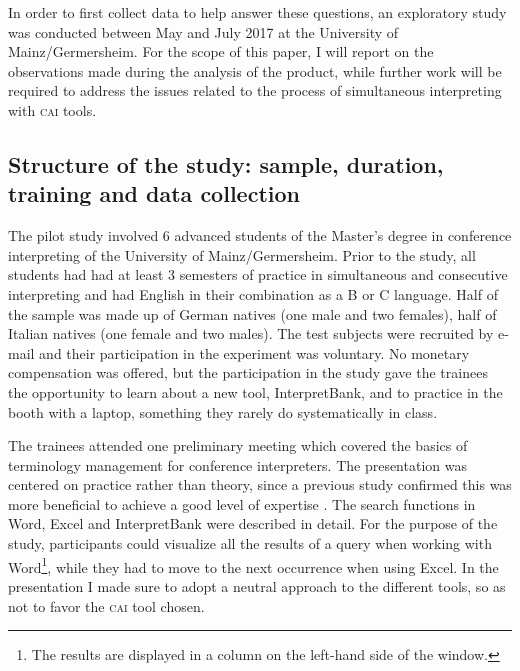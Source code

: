 \documentclass[output=paper]{langsci/langscibook}
\begin{document}
In order to first collect data to help answer these questions, an exploratory study was conducted between May and July 2017 at the University of Mainz\slash Germersheim. For the scope of this paper, I will report on the observations made during the analysis of the product, while further work will be required to address the issues related to the process of simultaneous interpreting with \textsc{cai} tools.

\subsection{Structure of the study: sample, duration, training and data collection}\label{sec:prandi:3.3}
The pilot study involved 6 advanced students of the Master’s degree in conference interpreting of the University of Mainz\slash Germersheim. Prior to the study, all students had had at least 3 semesters of practice in simultaneous and consecutive interpreting and had English in their combination as a B or C language. Half of the sample was made up of German natives (one male and two females), half of Italian natives (one female and two males). The test subjects were recruited by e-mail and their participation in the experiment was voluntary. No monetary compensation was offered, but the participation in the study gave the trainees the opportunity to learn about a new tool, InterpretBank, and to practice in the booth with a laptop, something they rarely do systematically in class.

The trainees attended one preliminary meeting which covered the basics of terminology management for conference interpreters. The presentation was centered on practice rather than theory, since a previous study confirmed this was more beneficial to achieve a good level of expertise \citep{Prandi2015a, Prandi2015b}. The search functions in Word, Excel and InterpretBank were described in detail. For the purpose of the study, participants could visualize all the results of a query when working with Word\footnote{The results are displayed in a column on the left-hand side of the window.}, while they had to move to the next occurrence when using Excel. In the presentation I made sure to adopt a neutral approach to the different tools, so as not to favor the \textsc{cai} tool chosen.
\end{document}
